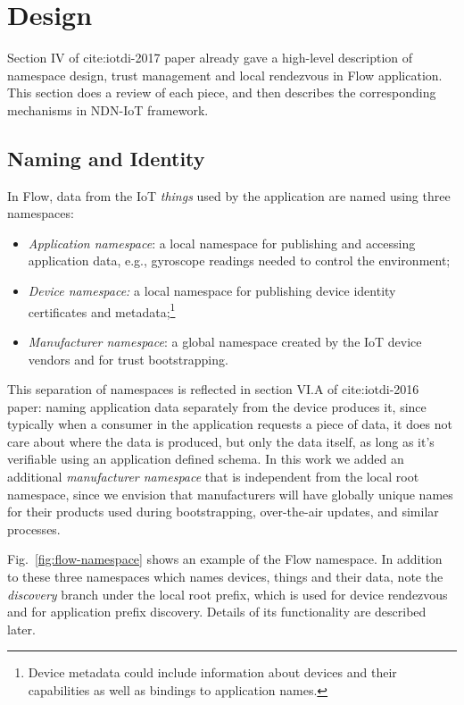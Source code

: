 \section{Design}
\label{sec:components}

Section IV of cite:iotdi-2017 paper already gave a high-level description of namespace design, trust management and local rendezvous in Flow application.
This section does a review of each piece, and then describes the corresponding mechanisms in NDN-IoT framework.

\subsection{Naming and Identity}
\label{sec:naming}

In Flow, data from the IoT \textit{things} used by the application are named using three namespaces:
\begin{itemize}
\item \emph{Application namespace}: a local namespace for publishing and accessing application data, e.g., gyroscope readings needed to control the environment; 
\item \emph{Device namespace:} a local namespace for publishing device identity certificates and metadata;\footnote{Device metadata could include information about devices and their capabilities as well as bindings to application names.}
\item \emph{Manufacturer namespace}: a global namespace created by the IoT device vendors and for trust bootstrapping.
\end{itemize}

This separation of namespaces is reflected in section VI.A of cite:iotdi-2016 paper: naming application data separately from the device produces it, since typically when a consumer in the application requests a piece of data, it does not care about where the data is produced, but only the data itself, as long as it's verifiable using an application defined schema.
In this work we added an additional \textit{manufacturer namespace} that is independent from the local root namespace, since we envision that manufacturers will have globally unique names for their products used during bootstrapping, over-the-air updates, and similar processes. 

Fig.~\ref{fig:flow-namespace} shows an example of the Flow namespace.
In addition to these three namespaces which names devices, things and their data, note the \textit{discovery} branch under the local root prefix, which is used for device rendezvous and for application prefix discovery.
Details of its functionality are described later.

